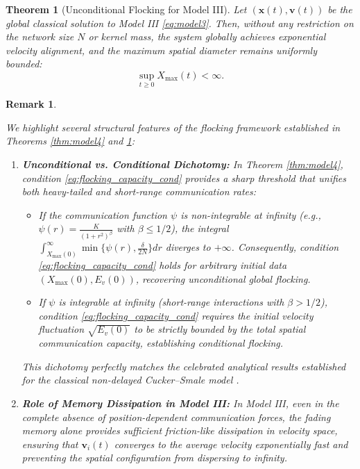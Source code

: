 \documentclass[11pt]{amsart}
\newtheorem{theorem}{Theorem}[section]
\newtheorem{remark}{Remark}[section]
\numberwithin{equation}{section}
\begin{document}
\begin{theorem}[Unconditional Flocking for Model III]\label{thm:model3}
Let $(\boldsymbol{x}(t),\boldsymbol{v}(t))$ be the global classical solution to Model III \eqref{eq:model3}. Then, without any restriction on the network size $N$ or kernel mass, the system globally achieves exponential velocity alignment, and the maximum spatial diameter remains uniformly bounded:
$$
\sup_{t\ge0} X_{\max}(t) < \infty.
$$
\end{theorem}

\begin{remark}\label{rem:flocking_discussion}
{\rm
We highlight several structural features of the flocking framework established in Theorems \ref{thm:model4} and \ref{thm:model3}:
\begin{enumerate}
    \item [(i)] \textbf{Unconditional vs. Conditional Dichotomy:} In Theorem \ref{thm:model4}, condition \eqref{eq:flocking_capacity_cond} provides a sharp threshold that unifies both heavy-tailed and short-range communication rates:
    \begin{itemize}
        \item If the communication function $\psi$ is non-integrable at infinity (e.g., $\psi(r) = \frac{K}{(1+r^2)^\beta}$ with $\beta \le 1/2$), the integral $\int_{X_{\max}(0)}^\infty \min\{\psi(r), \frac{\delta}{2N}\} dr$ diverges to $+\infty$. Consequently, condition \eqref{eq:flocking_capacity_cond} holds for arbitrary initial data $(X_{\max}(0), E_v(0))$, recovering unconditional global flocking.
        \item If $\psi$ is integrable at infinity (short-range interactions with $\beta > 1/2$), condition \eqref{eq:flocking_capacity_cond} requires the initial velocity fluctuation $\sqrt{E_v(0)}$ to be strictly bounded by the total spatial communication capacity, establishing conditional flocking.
    \end{itemize}
    This dichotomy perfectly matches the celebrated analytical results established for the classical non-delayed Cucker--Smale model \cite{Cucker2007, Ha2009}.
    \item [(ii)] \textbf{Role of Memory Dissipation in Model III:} In Model III, even in the complete absence of position-dependent communication forces, the fading memory alone provides sufficient friction-like dissipation in velocity space, ensuring that $\boldsymbol{v}_i(t)$ converges to the average velocity exponentially fast and preventing the spatial configuration from dispersing to infinity.
\end{enumerate}
}
\end{remark}
\end{document}
